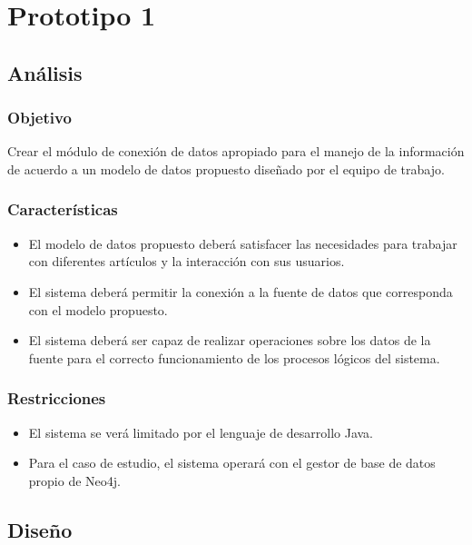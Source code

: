 \chapter{Prototipo 1}
  \section{Análisis}
    \subsection{Objetivo}
      Crear el módulo de conexión de datos apropiado para el manejo de la información de acuerdo a un modelo de datos propuesto diseñado por el equipo de trabajo.

    \subsection{Características}
      \begin{itemize}
        \item El modelo de datos propuesto deberá satisfacer las necesidades para trabajar con diferentes artículos y la interacción con sus usuarios.
        \item El sistema deberá permitir la conexión a la fuente de datos que corresponda con el modelo propuesto.
        \item El sistema deberá ser capaz de realizar operaciones sobre los datos de la fuente para el correcto funcionamiento de los procesos lógicos del sistema.
      \end{itemize}

    \subsection{Restricciones}
      \begin{itemize}
        \item El sistema se verá limitado por el lenguaje de desarrollo Java.
        \item Para el caso de estudio, el sistema operará con el gestor de base de datos propio de Neo4j. 
      \end{itemize}

  \section{Diseño}

